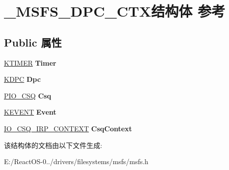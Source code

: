 \hypertarget{struct___m_s_f_s___d_p_c___c_t_x}{}\section{\+\_\+\+M\+S\+F\+S\+\_\+\+D\+P\+C\+\_\+\+C\+T\+X结构体 参考}
\label{struct___m_s_f_s___d_p_c___c_t_x}
\subsection*{Public 属性}
\begin{DoxyCompactItemize}
\item 
\mbox{\label{struct___m_s_f_s___d_p_c___c_t_x_aeb9b0d3fe196f1d45ad1e575b130d8dd}} 
\hyperlink{struct___k_t_i_m_e_r}{K\+T\+I\+M\+ER} {\bfseries Timer}
\item 
\mbox{\label{struct___m_s_f_s___d_p_c___c_t_x_abf534c23a4c853d58a69aeb669fc0fb1}} 
\hyperlink{struct___k_d_p_c}{K\+D\+PC} {\bfseries Dpc}
\item 
\mbox{\label{struct___m_s_f_s___d_p_c___c_t_x_a8d0bc4e2e46725cc82585a9b08d07d4d}} 
\hyperlink{struct___i_o___c_s_q}{P\+I\+O\+\_\+\+C\+SQ} {\bfseries Csq}
\item 
\mbox{\label{struct___m_s_f_s___d_p_c___c_t_x_a7e3003867d6bdf3b8ccd1cff4fc9952f}} 
\hyperlink{struct___k_e_v_e_n_t}{K\+E\+V\+E\+NT} {\bfseries Event}
\item 
\mbox{\label{struct___m_s_f_s___d_p_c___c_t_x_aafdd90d180f32f685f2f889d76d8dd8a}} 
\hyperlink{struct___i_o___c_s_q___i_r_p___c_o_n_t_e_x_t}{I\+O\+\_\+\+C\+S\+Q\+\_\+\+I\+R\+P\+\_\+\+C\+O\+N\+T\+E\+XT} {\bfseries Csq\+Context}
\end{DoxyCompactItemize}


该结构体的文档由以下文件生成\+:\begin{DoxyCompactItemize}
\item 
E\+:/\+React\+O\+S-\/0../drivers/filesystems/msfs/msfs.\+h\end{DoxyCompactItemize}
